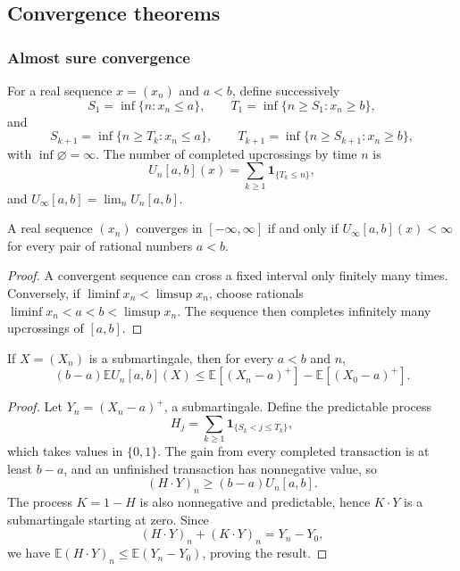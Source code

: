 \subsection{Convergence theorems}

\subsubsection{Almost sure convergence}

\begin{de}[Upcrossings]
For a real sequence $x=(x_n)$ and $a<b$, define successively
\[
S_1=\inf\{n:x_n\leq a\},
\qquad
T_1=\inf\{n\geq S_1:x_n\geq b\},
\]
and
\[
S_{k+1}=\inf\{n\geq T_k:x_n\leq a\},
\qquad
T_{k+1}=\inf\{n\geq S_{k+1}:x_n\geq b\},
\]
with $\inf\varnothing=\infty$. The number of completed upcrossings by time
$n$ is
\[
U_n[a,b](x)=\sum_{k\geq1}\mathbf1_{\{T_k\leq n\}},
\]
and $U_\infty[a,b]=\lim_nU_n[a,b]$.
\end{de}

\begin{lem}
A real sequence $(x_n)$ converges in $[-\infty,\infty]$ if and only if
$U_\infty[a,b](x)<\infty$ for every pair of rational numbers $a<b$.
\end{lem}

\begin{proof}
A convergent sequence can cross a fixed interval only finitely many times.
Conversely, if $\liminf x_n<\limsup x_n$, choose rationals
$\liminf x_n<a<b<\limsup x_n$. The sequence then completes infinitely many
upcrossings of $[a,b]$.
\end{proof}

\begin{thm}
If $X=(X_n)$ is a submartingale, then for every $a<b$ and $n$,
\[
(b-a)\mathbb E U_n[a,b](X)
 \leq
\mathbb E[(X_n-a)^+]-\mathbb E[(X_0-a)^+].
\]
\end{thm}

\begin{proof}
Let $Y_n=(X_n-a)^+$, a submartingale. Define the predictable process
\[
H_j=\sum_{k\geq1}\mathbf1_{\{S_k<j\leq T_k\}},
\]
which takes values in $\{0,1\}$. The gain from every completed transaction is
at least $b-a$, and an unfinished transaction has nonnegative value, so
\[
(H\mathbin{\cdot}Y)_n\geq(b-a)U_n[a,b].
\]
The process $K=1-H$ is also nonnegative and predictable, hence
$K\mathbin{\cdot}Y$ is a submartingale starting at zero. Since
\[
(H\mathbin{\cdot}Y)_n+(K\mathbin{\cdot}Y)_n=Y_n-Y_0,
\]
we have
$\mathbb E(H\mathbin{\cdot}Y)_n\leq\mathbb E(Y_n-Y_0)$, proving the result.
\end{proof}

